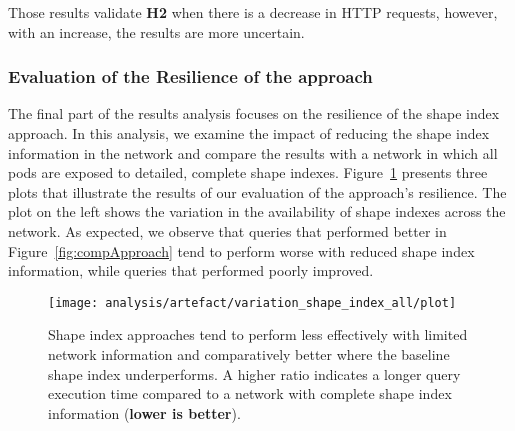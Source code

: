 Those results validate \textbf{H2} when there is a decrease in HTTP requests, however, with an increase, the results are more uncertain.

\fi


\subsubsection{Evaluation of the Resilience of the approach}

The final part of the results analysis focuses on the resilience of the shape index approach.
In this analysis, we examine the impact of reducing the shape index information in the network and compare the results with a network in which all pods are exposed to detailed, complete shape indexes.
Figure~\ref{fig:adaptShapeIndex} presents three plots that illustrate the results of our evaluation of the approach's resilience.
The plot on the left shows the variation in the availability of shape indexes across the network. 
As expected, we observe that queries that performed better in Figure~\ref{fig:compApproach} tend to perform worse with reduced shape index information, while queries that performed poorly improved. 


\begin{figure}
    \centering
    \texttt{[image: analysis/artefact/variation\_shape\_index\_all/plot]}
    \caption{
    Shape index approaches tend to perform less effectively with limited network information and comparatively better where the baseline shape index underperforms.
    A higher ratio indicates a longer query execution time compared to a network with complete shape index information (\textbf{lower is better}).
    }
    \label{fig:adaptShapeIndex}
\end{figure}


